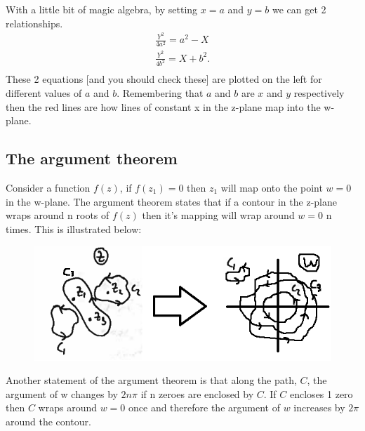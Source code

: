 \hspace{0.6cm}
%
\begin{minipage}[t]{0.47\linewidth}
	\vspace{0.3cm}
	With a little bit of magic algebra, by setting $x=a$ and $y=b$ we can get 2 relationships.
	\begin{align*}
	\frac{Y^2}{4a^2}=a^2-X \\
	\frac{Y^2}{4b^2}=X+b^2. \\
	\end{align*}
These 2 equations [and you should check these] are plotted on the left for different values of $a$ and $b$.
 Remembering that $a$ and $b$ are $x$ and $y$ respectively then the red lines are how lines of constant x in the z-plane map into the w-plane.
\end{minipage}
%
%
\subsection{The argument theorem}
Consider a function $f(z)$, if $f(z_1)=0$ then $z_1$ will map onto the point $w=0$ in the w-plane.
 The argument theorem states that if a contour in the z-plane wraps around n roots of $f(z)$ then it's mapping will wrap around $w=0$ n times. 
 This is illustrated below:
\begin{figure}[H]
	\centering
	\includegraphics[width=\linewidth]{complex/argthm}
	\captionsetup{font=small} 	
\end{figure}
\noindent Another statement of the argument theorem is that along the path, $C$, the argument of w changes by $2n\pi$ if n zeroes are enclosed by $C$. 
If $C$ encloses 1 zero then $C$ wraps around $w=0$ once and therefore the argument of $w$ increases by $2\pi$ around the contour.
%
